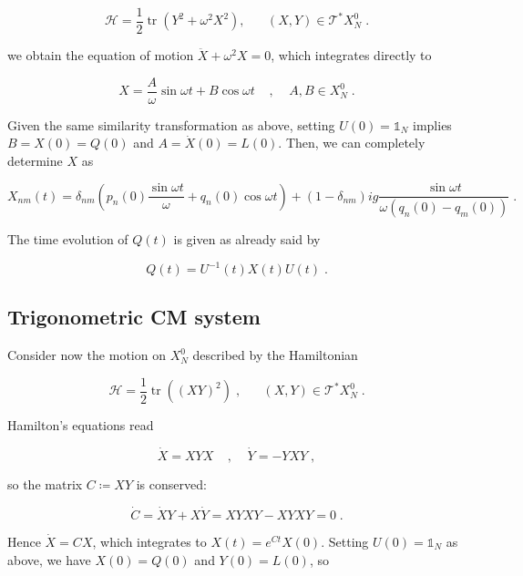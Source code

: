 \begin{equation}
    \mathcal{H} = \frac{1}{2}\operatorname{tr}(Y^2 + \omega^2 X^2), \;\;\;\;\;\;(X,Y) \in \mathcal{T}^\ast X^0_N\;.
\end{equation}

we obtain the equation of motion $\ddot X + \omega^2 X= 0$, which integrates directly to 

\begin{equation}
    X = \frac{A}{\omega}\sin{\omega t} + B\cos{\omega t}\;\;\;\;,\;\;\;\;A, B \in X^0_N\;.
\end{equation}

Given the same similarity transformation as above, setting $U(0) = \mathbb{1}_N$ implies $B = X(0) = Q(0)$ and $A = \dot X(0) = L(0)$. Then, we can completely determine $X$ as

\begin{equation}
    X_{nm} (t) = \delta_{nm} (p_n(0)\frac{\sin{\omega t}}{\omega} + q_n(0)\cos{\omega t}) + (1 - \delta_{nm}) ig \frac{\sin{\omega t}}{\omega(q_n(0) - q_m(0))}\;.
\end{equation}

The time evolution of $Q(t)$ is given as already said by

\begin{equation}
    Q(t) = U^{-1}(t) X(t) U(t)\;.
\end{equation}

\subsection{Trigonometric CM system}
Consider now the motion on $X^0_N$ described by the Hamiltonian

\begin{equation}
    \mathcal{H} = \frac{1}{2}\operatorname{tr}((XY)^2)\;, \;\;\;\;\;\;(X,Y) \in \mathcal{T}^\ast X^0_N\;.
\end{equation}

Hamilton's equations read

\begin{equation}
    \dot X = XYX\;\;\;\;,\;\;\;\;\dot Y = -YXY\;,
\end{equation}

so the matrix $C \coloneqq XY$ is conserved:

\begin{equation}
    \dot C = \dot X Y + X \dot Y = XYXY - XYXY = 0\;.
\end{equation}

Hence $\dot X = CX$, which integrates to $X(t) = e^{Ct}X(0)$. Setting $U(0) = \mathbb{1}_N$ as above, we have $X(0) = Q(0)$ and $Y(0) = L(0)$, so

